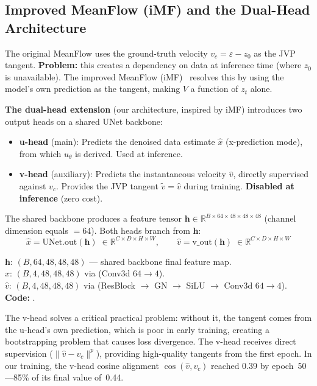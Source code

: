 \subsection{Improved MeanFlow (iMF) and the Dual-Head Architecture}
\label{sec:vhead}

The original MeanFlow uses the ground-truth velocity
$v_c = \varepsilon - z_0$ as the JVP tangent.  \textbf{Problem:} this creates
a dependency on data at inference time (where $z_0$ is unavailable).  The
improved MeanFlow (iMF)~\cite{imf} resolves this by using the model's own
prediction as the tangent, making $V$ a function of $z_t$ alone.

\textbf{The dual-head extension} (our architecture, inspired by iMF) introduces
two output heads on a shared UNet backbone:
\begin{itemize}[nosep]
  \item \textbf{u-head} (main): Predicts the denoised data estimate $\hat{x}$
    (x-prediction mode), from which $u_\theta$ is derived.  Used at inference.
  \item \textbf{v-head} (auxiliary): Predicts the instantaneous velocity
    $\hat{v}$, directly supervised against $v_c$.  Provides the JVP tangent
    $\tilde{v} = \hat{v}$ during training.  \textbf{Disabled at inference}
    (zero cost).
\end{itemize}

The shared backbone produces a feature tensor $\mathbf{h} \in
\mathbb{R}^{B \times 64 \times 48 \times 48 \times 48}$ (channel dimension
equals $= 64$).  Both heads branch from $\mathbf{h}$:
\begin{equation}
  \hat{x} = \mathrm{UNet.out}(\mathbf{h})
    \;\in \mathbb{R}^{C \times D \times H \times W},
  \qquad
  \hat{v} = \mathrm{v\_out}(\mathbf{h})
    \;\in \mathbb{R}^{C \times D \times H \times W}
  \label{eq:dual_heads}
\end{equation}
\begin{shapes}
$\mathbf{h}$: $(B, 64, 48, 48, 48)$ --- shared backbone final feature map.\\
$\hat{x}$: $(B, 4, 48, 48, 48)$ via  (Conv3d $64 \to 4$).\\
$\hat{v}$: $(B, 4, 48, 48, 48)$ via  (ResBlock $\to$ GN $\to$ SiLU $\to$ Conv3d $64 \to 4$).\\
\textbf{Code:} .
\end{shapes}

\noindent
The v-head solves a critical practical problem: without it, the tangent comes
from the u-head's own prediction, which is poor in early training, creating a
bootstrapping problem that causes loss divergence.  The v-head receives direct
supervision ($\|\hat{v} - v_c\|^p$), providing high-quality tangents from the
first epoch.  In our training, the v-head cosine alignment $\cos(\hat{v},v_c)$
reached 0.39 by epoch~50---85\% of its final value of~0.44.